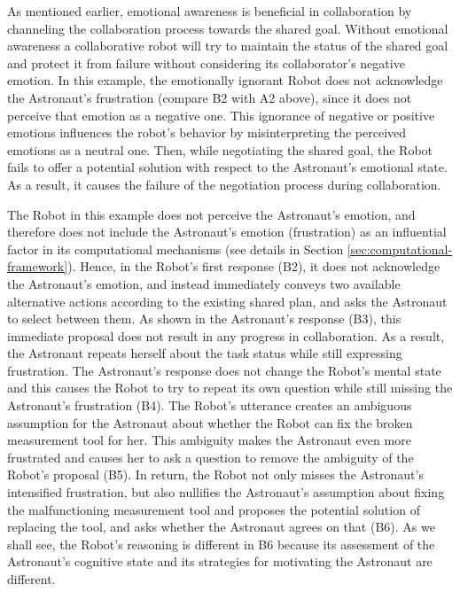 As mentioned earlier, emotional awareness is beneficial in collaboration by
channeling the collaboration process towards the shared goal. Without emotional
awareness a collaborative robot will try to maintain the status of the shared
goal and protect it from failure without considering its collaborator's negative
emotion. In this example, the emotionally ignorant Robot does not acknowledge
the Astronaut's frustration (compare B2 with A2 above), since it does not
perceive that emotion as a negative one. This ignorance of negative or positive
emotions influences the robot's behavior by misinterpreting the perceived
emotions as a neutral one. Then, while negotiating the shared goal, the Robot
fails to offer a potential solution with respect to the Astronaut's emotional
state. As a result, it causes the failure of the negotiation process during
collaboration.

The Robot in this example does not perceive the Astronaut's emotion, and
therefore does not include the Astronaut's emotion (frustration) as an
influential factor in its computational mechanisms (see details in Section
\ref{sec:computational-framework}). Hence, in the Robot's first response (B2),
it does not acknowledge the Astronaut's emotion, and instead immediately conveys
two available alternative actions according to the existing shared plan, and
asks the Astronaut to select between them. As shown in the Astronaut's response
(B3), this immediate proposal does not result in any progress in collaboration.
As a result, the Astronaut repeats herself about the task status while still
expressing frustration. The Astronaut's response does not change the Robot's
mental state and this causes the Robot to try to repeat its own question while
still missing the Astronaut's frustration (B4). The Robot's utterance creates an
ambiguous assumption for the Astronaut about whether the Robot can fix the
broken measurement tool for her. This ambiguity makes the Astronaut even more
frustrated and causes her to ask a question to remove the ambiguity of the
Robot's proposal (B5). In return, the Robot not only misses the Astronaut's
intensified frustration, but also nullifies the Astronaut's assumption about
fixing the malfunctioning measurement tool and proposes the potential solution
of replacing the tool, and asks whether the Astronaut agrees on that (B6). As we
shall see, the Robot's reasoning is different in B6 because its assessment of
the Astronaut's cognitive state and its strategies for motivating the Astronaut
are different.

